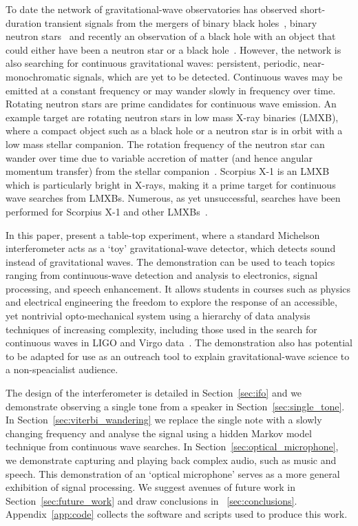 \documentclass[paper-main.tex]{subfiles}
\begin{document}
To date the network of gravitational-wave observatories has observed short-duration transient signals from the mergers of 
binary black holes~\cite{GW150914,GW151226,GW170104,GW170814,GW190521,GWTC-1:2018}, 
binary neutron stars~\cite{GW170817,GW170817multi,GW190425,GWTC-1:2018} and recently an observation of a black hole with an object that could either have been a neutron star or a black hole~\cite{GW190814}. 
However, the network is also searching for continuous gravitational waves: persistent, periodic, near-monochromatic signals, which are yet to be detected. 
Continuous waves may be emitted at a constant frequency or may wander slowly in frequency over time. 
Rotating neutron stars are prime candidates for continuous wave emission. 
An example target are rotating neutron stars in low mass X-ray binaries (LMXB), where a compact object such as a black hole or a neutron star is in orbit with a low mass stellar companion.
The rotation frequency of the neutron star can wander over time due to variable accretion of matter (and hence angular momentum transfer) from the stellar companion~\cite{xraybinaries:1997}. 
Scorpius X-1 is an LMXB which is particularly bright in X-rays, making it a prime target for continuous wave searches from LMXBs. 
Numerous, as yet unsuccessful, searches have been performed for Scorpius X-1 and other LMXBs~\cite{ScoX1O2Viterbi:2019, ScoX1ViterbiO1:2017, RadiometerO1O2:2019, SearchRadiometerO1:2017, SearchCrossCorrO1:2017, ScoX1ViterbiO1:2017, SearchTwoSpecS6:2017, MiddletonEtAlO2LMXBs:2020}. 


In this paper, present a table-top experiment, where a standard Michelson interferometer acts as a `toy' gravitational-wave detector, which detects sound instead of gravitational waves. 
The demonstration can be used to teach topics ranging from continuous-wave detection and analysis to electronics, signal processing, and speech enhancement. 
It allows students in courses such as physics and electrical engineering the freedom to explore the response of an accessible, yet nontrivial opto-mechanical system using a hierarchy of data analysis techniques of increasing complexity, including those used in the search for continuous waves in LIGO and Virgo data~\cite{ScoX1O2Viterbi:2019, SuvorovaEtAl:2017,SuvorovaEtAl:2016}. 
The demonstration also has potential to be adapted for use as an outreach tool to explain gravitational-wave science to a non-speacialist audience. 


The design of the interferometer is detailed in Section~\ref{sec:ifo} and we demonstrate observing a single tone from a speaker in Section~\ref{sec:single_tone}. 
In Section~\ref{sec:viterbi_wandering} we replace the single note with a slowly changing frequency and analyse the signal using a hidden Markov model technique from continuous wave searches. 
In Section~\ref{sec:optical_microphone}, we demonstrate capturing and playing back complex audio, such as music and speech. 
This demonstration of an ‘optical microphone’ serves as a more general exhibition of signal processing. 
We suggest avenues of future work in Section~\ref{sec:future_work} and draw conclusions in ~\ref{sec:conclusions}. 
Appendix~\ref{app:code} collects the software and scripts used to produce this work.
\end{document}
